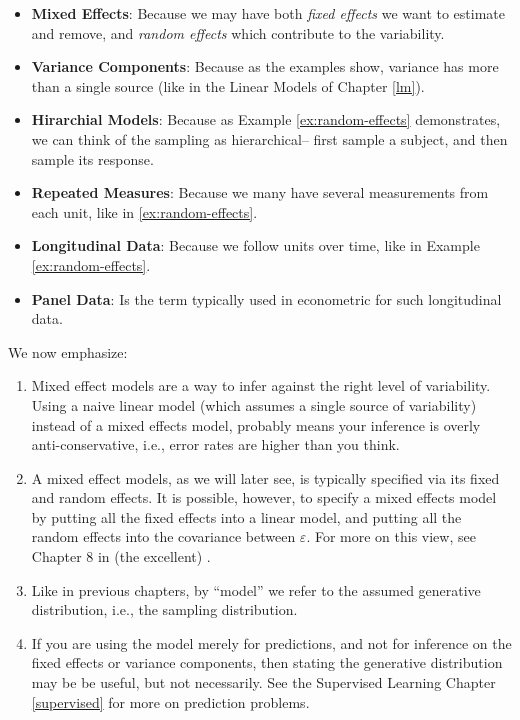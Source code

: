 \documentclass[]{book}
\providecommand{\tightlist}{%
  \setlength{\itemsep}{0pt}\setlength{\parskip}{0pt}}
\theoremstyle{definition}
\theoremstyle{definition}
\theoremstyle{remark}
\begin{document}
\begin{itemize}
\tightlist
\item
  \textbf{Mixed Effects}: Because we may have both \emph{fixed effects}
  we want to estimate and remove, and \emph{random effects} which
  contribute to the variability.
\item
  \textbf{Variance Components}: Because as the examples show, variance
  has more than a single source (like in the Linear Models of Chapter
  \ref{lm}).
\item
  \textbf{Hirarchial Models}: Because as Example \ref{ex:random-effects}
  demonstrates, we can think of the sampling as hierarchical-- first
  sample a subject, and then sample its response.
\item
  \textbf{Repeated Measures}: Because we many have several measurements
  from each unit, like in \ref{ex:random-effects}.
\item
  \textbf{Longitudinal Data}: Because we follow units over time, like in
  Example \ref{ex:random-effects}.
\item
  \textbf{Panel Data}: Is the term typically used in econometric for
  such longitudinal data.
\end{itemize}

We now emphasize:

\begin{enumerate}
\def\labelenumi{\arabic{enumi}.}
\tightlist
\item
  Mixed effect models are a way to infer against the right level of
  variability. Using a naive linear model (which assumes a single source
  of variability) instead of a mixed effects model, probably means your
  inference is overly anti-conservative, i.e., error rates are higher
  than you think.
\item
  A mixed effect models, as we will later see, is typically specified
  via its fixed and random effects. It is possible, however, to specify
  a mixed effects model by putting all the fixed effects into a linear
  model, and putting all the random effects into the covariance between
  \(\varepsilon\). For more on this view, see Chapter 8 in (the
  excellent) \citet{weiss2005modeling}.
\item
  Like in previous chapters, by ``model'' we refer to the assumed
  generative distribution, i.e., the sampling distribution.
\item
  If you are using the model merely for predictions, and not for
  inference on the fixed effects or variance components, then stating
  the generative distribution may be be useful, but not necessarily. See
  the Supervised Learning Chapter \ref{supervised} for more on
  prediction problems.
\end{enumerate}
\end{document}
